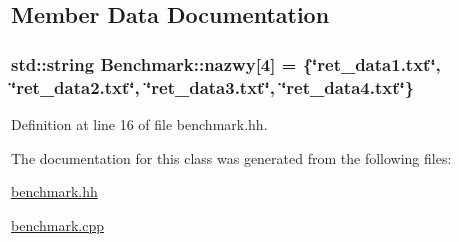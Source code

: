 \subsection{Member Data Documentation}
\hypertarget{class_benchmark_aee0beda65009e7334d34c5957f78c49a}{
\subsubsection[{nazwy}]{\setlength{\rightskip}{0pt plus 5cm}std\-::string Benchmark\-::nazwy\mbox{[}4\mbox{]} = \{\char`\"{}ret\-\_\-data1.\-txt\char`\"{}, \char`\"{}ret\-\_\-data2.\-txt\char`\"{}, \char`\"{}ret\-\_\-data3.\-txt\char`\"{}, \char`\"{}ret\-\_\-data4.\-txt\char`\"{}\}\hspace{0.3cm}{\ttfamily [private]}}}\label{class_benchmark_aee0beda65009e7334d34c5957f78c49a}


Definition at line 16 of file benchmark.\-hh.



The documentation for this class was generated from the following files\-:\begin{DoxyCompactItemize}
\item 
\hyperlink{benchmark_8hh}{benchmark.\-hh}\item 
\hyperlink{benchmark_8cpp}{benchmark.\-cpp}\end{DoxyCompactItemize}
